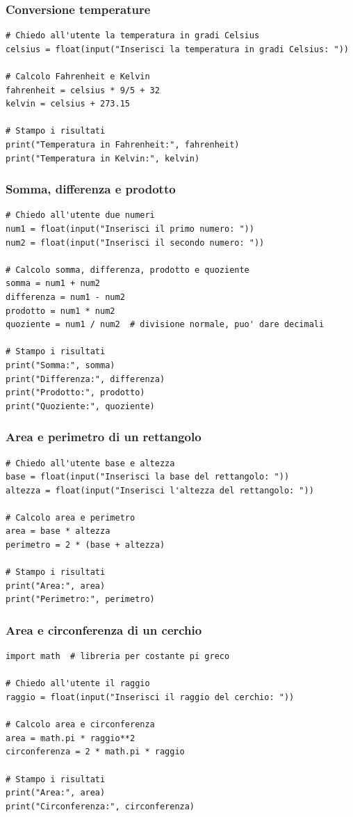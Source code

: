 \documentclass[a4paper,12pt]{article}
\begin{document}
	\newpage
	\subsubsection{Conversione temperature}
	\begin{lstlisting}
# Chiedo all'utente la temperatura in gradi Celsius
celsius = float(input("Inserisci la temperatura in gradi Celsius: "))
	
# Calcolo Fahrenheit e Kelvin
fahrenheit = celsius * 9/5 + 32
kelvin = celsius + 273.15
		
# Stampo i risultati
print("Temperatura in Fahrenheit:", fahrenheit)
print("Temperatura in Kelvin:", kelvin)
	\end{lstlisting}
	
	\newpage
	\subsubsection{Somma, differenza e prodotto}
	\begin{lstlisting}
# Chiedo all'utente due numeri
num1 = float(input("Inserisci il primo numero: "))
num2 = float(input("Inserisci il secondo numero: "))
		
# Calcolo somma, differenza, prodotto e quoziente
somma = num1 + num2
differenza = num1 - num2
prodotto = num1 * num2
quoziente = num1 / num2  # divisione normale, puo' dare decimali
		
# Stampo i risultati
print("Somma:", somma)
print("Differenza:", differenza)
print("Prodotto:", prodotto)
print("Quoziente:", quoziente)
	\end{lstlisting}
	
	\newpage
	\subsubsection{Area e perimetro di un rettangolo}
	\begin{lstlisting}
# Chiedo all'utente base e altezza
base = float(input("Inserisci la base del rettangolo: "))
altezza = float(input("Inserisci l'altezza del rettangolo: "))
		
# Calcolo area e perimetro
area = base * altezza
perimetro = 2 * (base + altezza)
		
# Stampo i risultati
print("Area:", area)
print("Perimetro:", perimetro)
	\end{lstlisting}
	
	\newpage
	\subsubsection{Area e circonferenza di un cerchio}
	\begin{lstlisting}
import math  # libreria per costante pi greco
		
# Chiedo all'utente il raggio
raggio = float(input("Inserisci il raggio del cerchio: "))
		
# Calcolo area e circonferenza
area = math.pi * raggio**2
circonferenza = 2 * math.pi * raggio
		
# Stampo i risultati
print("Area:", area)
print("Circonferenza:", circonferenza)
	\end{lstlisting}
	
\end{document}
